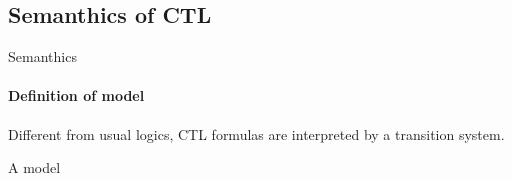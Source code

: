 \subsection{Semanthics of CTL}
\begin{frame}{Semanthics}
	\framesubtitle{Definition of model}
	Different from usual logics, CTL formulas are interpreted by a transition system.
	\begin{definition}
		A model
	\end{definition}
\end{frame}